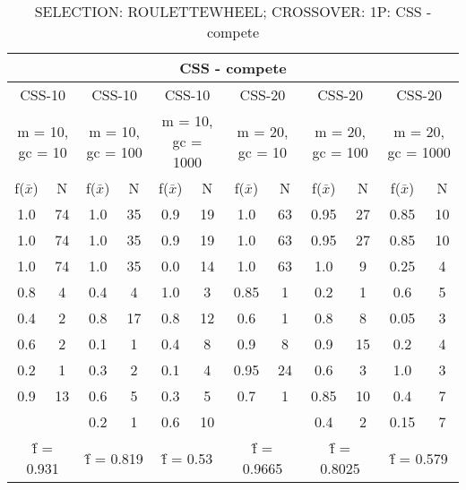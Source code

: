 \begin{table}[H]
	\centering
	\caption{SELECTION: ROULETTEWHEEL; CROSSOVER: 1P: CSS - compete}
	\begin{adjustbox}{width=1\textwidth}
		\begin{tabular}{ |c|c||c|c||c|c||c|c||c|c||c|c| }
			\hline
			\multicolumn{12}{|c|}{CSS - compete} \\
			\hline
			\multicolumn{2}{|c||}{CSS-10} & \multicolumn{2}{c||}{CSS-10} & \multicolumn{2}{c||}{CSS-10} & \multicolumn{2}{c||}{CSS-20} & \multicolumn{2}{c||}{CSS-20} & \multicolumn{2}{c|}{CSS-20}\\
			\hline
			\multicolumn{2}{|c||}{m = 10, gc = 10} & \multicolumn{2}{c||}{m = 10, gc = 100} & \multicolumn{2}{c||}{m = 10, gc = 1000} & \multicolumn{2}{c||}{m = 20, gc = 10} & \multicolumn{2}{c||}{m = 20, gc = 100} & \multicolumn{2}{c|}{m = 20, gc = 1000}\\
			\hline
			f($\bar{x}$) & N & f($\bar{x}$) & N & f($\bar{x}$) & N & f($\bar{x}$) & N & f($\bar{x}$) & N & f($\bar{x}$) & N\\
			\hline
			\hline
			1.0 & 74 & 1.0 & 35 & 0.9 & 19 & 1.0 & 63 & 0.95 & 27 & 0.85 & 10\\
			\hline
			1.0 & 74 & 1.0 & 35 & 0.9 & 19 & 1.0 & 63 & 0.95 & 27 & 0.85 & 10\\
			1.0 & 74 & 1.0 & 35 & 0.0 & 14 & 1.0 & 63 & 1.0 & 9 & 0.25 & 4\\
			0.8 & 4 & 0.4 & 4 & 1.0 & 3 & 0.85 & 1 & 0.2 & 1 & 0.6 & 5\\
			0.4 & 2 & 0.8 & 17 & 0.8 & 12 & 0.6 & 1 & 0.8 & 8 & 0.05 & 3\\
			0.6 & 2 & 0.1 & 1 & 0.4 & 8 & 0.9 & 8 & 0.9 & 15 & 0.2 & 4\\
			0.2 & 1 & 0.3 & 2 & 0.1 & 4 & 0.95 & 24 & 0.6 & 3 & 1.0 & 3\\
			0.9 & 13 & 0.6 & 5 & 0.3 & 5 & 0.7 & 1 & 0.85 & 10 & 0.4 & 7\\
			&   & 0.2 & 1 & 0.6 & 10 &   &   & 0.4 & 2 & 0.15 & 7\\
			\hline
			\multicolumn{2}{|c||}{\^{f} = 0.931} & \multicolumn{2}{c||}{\^{f} = 0.819} & \multicolumn{2}{c||}{\^{f} = 0.53} & \multicolumn{2}{c||}{\^{f} = 0.9665} & \multicolumn{2}{c||}{\^{f} = 0.8025} & \multicolumn{2}{c|}{\^{f} = 0.579}\\
			\hline
		\end{tabular}
	\end{adjustbox}
\end{table}
